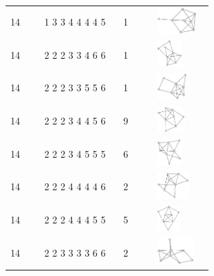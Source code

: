 \begin{table}[h!]
\begin{tabular}{m{0.15\linewidth} m{0.35\linewidth} m{0.15\linewidth} m{0.25\linewidth}}
14 & 1 3 3 4 4 4 4 5 & 1 & \includegraphics[height=1cm]{15-universal-graphs/img/degree-sequences-example-graphs/graph-4-8-79}\\
14 & 2 2 2 3 3 4 6 6 & 1 & \includegraphics[height=1cm]{15-universal-graphs/img/degree-sequences-example-graphs/graph-4-8-80}\\
14 & 2 2 2 3 3 5 5 6 & 1 & \includegraphics[height=1cm]{15-universal-graphs/img/degree-sequences-example-graphs/graph-4-8-81}\\
14 & 2 2 2 3 4 4 5 6 & 9 & \includegraphics[height=1cm]{15-universal-graphs/img/degree-sequences-example-graphs/graph-4-8-82}\\
14 & 2 2 2 3 4 5 5 5 & 6 & \includegraphics[height=1cm]{15-universal-graphs/img/degree-sequences-example-graphs/graph-4-8-83}\\
14 & 2 2 2 4 4 4 4 6 & 2 & \includegraphics[height=1cm]{15-universal-graphs/img/degree-sequences-example-graphs/graph-4-8-84}\\
14 & 2 2 2 4 4 4 5 5 & 5 & \includegraphics[height=1cm]{15-universal-graphs/img/degree-sequences-example-graphs/graph-4-8-85}\\
14 & 2 2 3 3 3 3 6 6 & 2 & \includegraphics[height=1cm]{15-universal-graphs/img/degree-sequences-example-graphs/graph-4-8-86}\\

\end{tabular}
\end{table}
